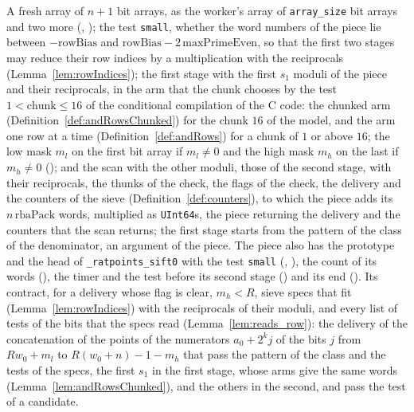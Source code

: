 \begin{definition}\label{def:siftPiece}
  \leanok
  A fresh array of $n + 1$ bit arrays, as the worker's array of \verb|array_size| bit arrays and two
  more (, ); the test
  \verb|small|, whether the word numbers of the piece lie between $-\mathrm{rowBias}$ and
  $\mathrm{rowBias} - 2\,\mathrm{maxPrimeEven}$, so that the first two stages may reduce their row
  indices by a multiplication with the reciprocals (Lemma~\ref{lem:rowIndices}); the first stage
  with the first $s_1$ moduli of the piece and their reciprocals, in the arm that the chunk chooses
  by the test $1 < \mathrm{chunk} \le 16$ of the conditional compilation of the C code: the chunked
  arm (Definition~\ref{def:andRowsChunked}) for the chunk $16$ of the model, and the arm one row at
  a time (Definition~\ref{def:andRows}) for a chunk of $1$ or above $16$; the low mask $m_l$ on the
  first bit array if $m_l \ne 0$ and the high mask $m_h$ on the last if $m_h \ne 0$
  (); and the scan with the other moduli, those of the second stage,
  with their reciprocals, the thunks of the check, the flags of the check, the delivery and the
  counters of the sieve (Definition~\ref{def:counters}), to which the piece adds its
  $n\,\mathrm{rbaPack}$ words, multiplied as \verb|UInt64|s, the piece returning the delivery and
  the counters that the scan returns; the first stage starts from the pattern of the class of the
  denominator, an argument of the piece. The piece also has the prototype and the head of
  \verb|_ratpoints_sift0| with the test \verb|small| (,
  ), the count of its words (), the timer and
  the test before its second stage () and its end
  (). Its contract, for a delivery whose flag is clear, $m_h < R$, sieve
  specs that fit (Lemma~\ref{lem:rowIndices}) with the reciprocals of their moduli, and every list
  of tests of the bits that the specs read (Lemma~\ref{lem:reads_row}): the delivery of the
  concatenation of the points of the numerators $a_0 + 2^k j$ of the bits $j$ from $R w_0 + m_l$ to
  $R (w_0 + n) - 1 - m_h$ that pass the pattern of the class and the tests of the specs, the first
  $s_1$ in the first stage, whose arms give the same words (Lemma~\ref{lem:andRowsChunked}), and the
  others in the second, and pass the test of a candidate.
\end{definition}

